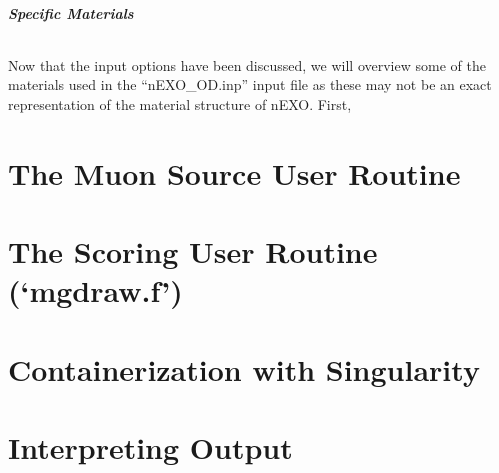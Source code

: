 \documentclass[10pt]{article}
\begin{document}
\subsubsection{Specific Materials}
\paragraph{}
Now that the input options have been discussed, we will overview some of the materials used in the ``nEXO\_OD.inp'' input file as these may not be an exact representation of the material structure of nEXO. First, 





\part*{The Muon Source User Routine}

\part*{The Scoring User Routine (`mgdraw.f')}

\part*{Containerization with Singularity}

\part*{Interpreting Output}

    






% 
% 
\end{document}
